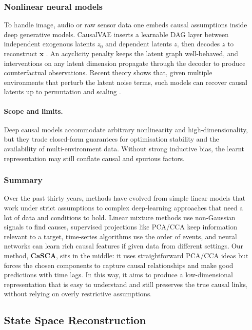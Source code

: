 \documentclass[14pt]{extarticle}
\begin{document}
	\subsubsection*{Nonlinear neural models}
	
	To handle image, audio or raw sensor data one embeds causal assumptions inside deep generative models.  
	CausalVAE inserts a learnable DAG layer between independent exogenous latents $z_0$ and dependent latents $z$, then decodes $z$ to reconstruct $\mathbf{x}$ \citep{Yang2021}.  
	An acyclicity penalty keeps the latent graph well-behaved, and interventions on any latent dimension propagate through the decoder to produce counterfactual observations.  
	Recent theory shows that, given multiple environments that perturb the latent noise terms, such models can recover causal latents up to permutation and scaling \citep{Scholkopf2021}.
	
	\paragraph{Scope and limits.}
	Deep causal models accommodate arbitrary nonlinearity and high-dimensionality, but they trade closed-form guarantees for optimisation stability and the availability of multi-environment data.  
	Without strong inductive bias, the learnt representation may still conflate causal and spurious factors.
	
	\subsubsection*{Summary}
	
	Over the past thirty years, methods have evolved from simple linear models that work under strict assumptions to complex deep‐learning approaches that need a lot of data and conditions to hold.  
	Linear mixture methods use non‐Gaussian signals to find causes, supervised projections like PCA/CCA keep information relevant to a target, time‐series algorithms use the order of events, and neural networks can learn rich causal features if given data from different settings.  
	Our method, \textbf{CaSCA}, sits in the middle: it uses straightforward PCA/CCA ideas but forces the chosen components to capture causal relationships and make good predictions with time lags.  
	In this way, it aims to produce a low‐dimensional representation that is easy to understand and still preserves the true causal links, without relying on overly restrictive assumptions.  
	
	\subsection{State Space Reconstruction}\label{sec:ssr}
	
\end{document}
